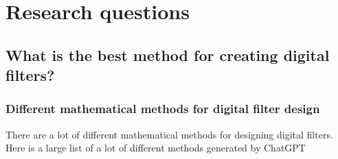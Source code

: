 \chapter{Research questions}

\section{What is the best method for creating digital filters?}
    \subsection{Different mathematical methods for digital filter design}
    There are a lot of different mathematical methods for designing digital filters. Here is a large list of a lot of different methods generated by ChatGPT

